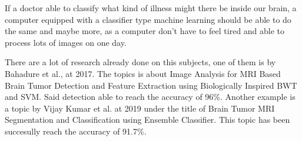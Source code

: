 \documentclass[12pt, a4paper]{article}
\begin{document}
If a doctor able to classify what kind of illness might there be inside our brain, a computer equipped with a classifier type machine learning should be able to do the same and maybe more, as a computer don't have to feel tired and able to process lots of images on one day.

There are a lot of research already done on this subjects, one of them is by Bahadure et al., at 2017. The topics is about Image Analysis for MRI Based Brain Tumor Detection and Feature Extraction using Biologically Inspired BWT and SVM. Said detection able to reach the accuracy of 96\%. Another example is a topic by Vijay Kumar et al. at 2019 under the title of Brain Tumor MRI Segmentation and Classification using Ensemble Classifier. This topic has been succesully reach the accuracy of 91.7\%.
\end{document}
